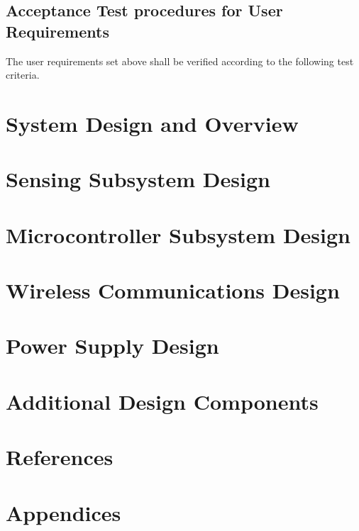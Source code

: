 \documentclass[12pt]{article}
\begin{document}
\subsection{Acceptance Test procedures for User Requirements}
The user requirements set above shall be verified according to the following test criteria.


\section{System Design and Overview}

\section{Sensing Subsystem Design}

\section{Microcontroller Subsystem Design}

\section{Wireless Communications Design}

\section{Power Supply Design}

\section{Additional Design Components}

\section{References}

\section{Appendices}
\end{document}
